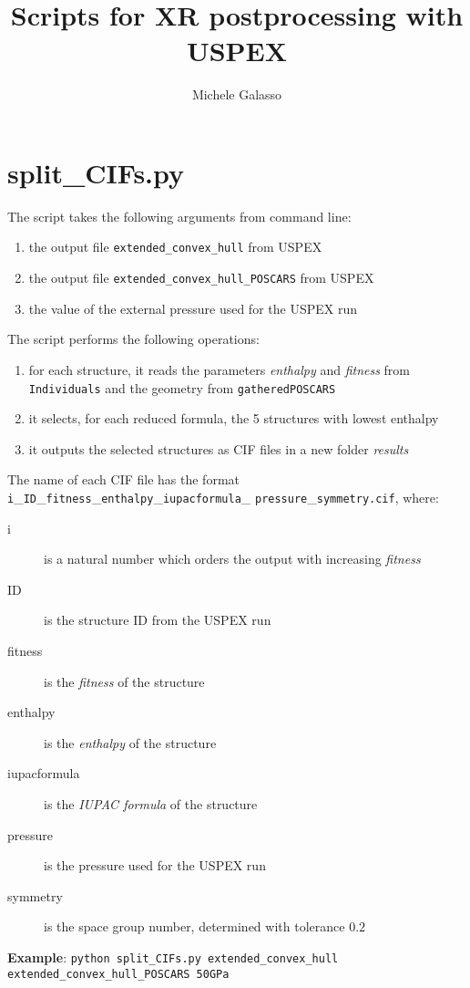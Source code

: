 \documentclass{article}
\begin{document}
\title{Scripts for XR postprocessing with USPEX}
\author{Michele Galasso}

\maketitle


\section{split\_CIFs.py}
The script takes the following arguments from command line:
\begin{enumerate}
	\item the output file \texttt{extended\_convex\_hull} from USPEX
	\item the output file \texttt{extended\_convex\_hull\_POSCARS} from USPEX
	\item the value of the external pressure used for the USPEX run
\end{enumerate}
The script performs the following operations:
\begin{enumerate}
	\item for each structure, it reads the parameters \emph{enthalpy} and \emph{fitness} from \texttt{Individuals} and the geometry from \texttt{gatheredPOSCARS}
	\item it selects, for each reduced formula, the 5 structures with lowest enthalpy
	\item it outputs the selected structures as CIF files in a new folder \textit{results}
\end{enumerate}
The name of each CIF file has the format \texttt{i}\_\texttt{ID}\_\texttt{fitness}\_\texttt{enthalpy}\_\texttt{iupacformula}\_ \texttt{pressure}\_\texttt{symmetry.cif}, where:
\begin{description}
	\item[i] is a natural number which orders the output with increasing \emph{fitness}
	\item[ID] is the structure ID from the USPEX run
	\item[fitness] is the \emph{fitness} of the structure
	\item[enthalpy] is the \emph{enthalpy} of the structure
	\item[iupacformula] is the \emph{IUPAC formula} of the structure
	\item[pressure] is the pressure used for the USPEX run
	\item[symmetry] is the space group number, determined with tolerance $0.2$\end{description}
\textbf{Example}: \texttt{python split\_CIFs.py extended\_convex\_hull \\ extended\_convex\_hull\_POSCARS 50GPa}
\end{document}
